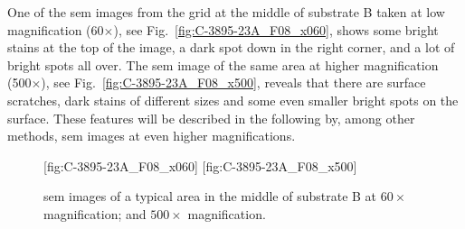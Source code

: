


One of the \ac{sem} images from the grid at the middle of substrate B taken at low magnification (60$\times$), see Fig.~\ref{fig:C-3895-23A_F08_x060}, shows some bright stains at the top of the image, a dark spot down in the right corner, and a lot of bright spots all over. The \ac{sem} image of the same area at higher magnification (500$\times$), see Fig.~\ref{fig:C-3895-23A_F08_x500}, reveals that there are surface scratches, dark stains of different sizes and some even smaller bright spots on the surface. These features will be described in the following by, among other methods, \ac{sem} images at even higher magnifications.

\begin{figure}[htbp]
    \centering
    [fig:C-3895-23A_F08_x060]
    \hfill
    [fig:C-3895-23A_F08_x500]
    \caption[\Ac{sem} images of a typical area in the middle of substrate B.]{\Ac{sem} images of a typical area in the middle of substrate B at  $60\times$ magnification; and  $500\times$ magnification.}
    \label{fig:SEM_C389523_overview}
\end{figure}

